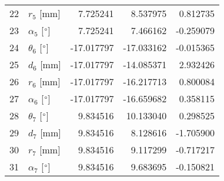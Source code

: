 \documentclass{standalone}%
\begin{document}
\begin{tabular}{llrrr}
22 &              $r_{5}$ [mm] &   7.725241 &   8.537975 &   0.812735 \\
23 &  $\alpha_{5}$ [$\degree$] &   7.725241 &   7.466162 &  -0.259079 \\
24 &  $\theta_{6}$ [$\degree$] & -17.017797 & -17.033162 &  -0.015365 \\
25 &              $d_{6}$ [mm] & -17.017797 & -14.085371 &   2.932426 \\
26 &              $r_{6}$ [mm] & -17.017797 & -16.217713 &   0.800084 \\
27 &  $\alpha_{6}$ [$\degree$] & -17.017797 & -16.659682 &   0.358115 \\
28 &  $\theta_{7}$ [$\degree$] &   9.834516 &  10.133040 &   0.298525 \\
29 &              $d_{7}$ [mm] &   9.834516 &   8.128616 &  -1.705900 \\
30 &              $r_{7}$ [mm] &   9.834516 &   9.117299 &  -0.717217 \\
31 &  $\alpha_{7}$ [$\degree$] &   9.834516 &   9.683695 &  -0.150821 \\
\bottomrule
\end{tabular}
%
\end{document}
